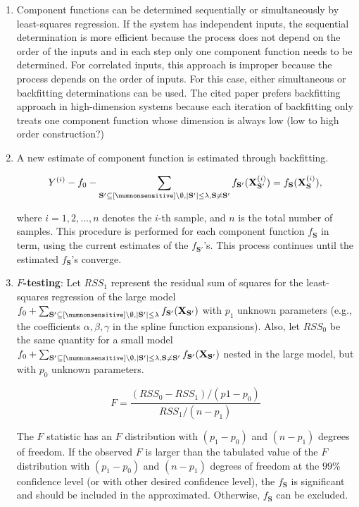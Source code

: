 \begin{enumerate}
\begin{enumerate}
		\item Component functions can be determined sequentially or simultaneously by least-squares regression. If the system has independent inputs, the sequential determination is more efficient because the process does not depend on the order of the inputs and in each step only one component function needs to be determined. For correlated inputs, this approach is improper because the process depends on the order of inputs. For this case, either simultaneous or backfitting determinations can be used. The cited paper prefers backfitting approach in high-dimension systems because each iteration of backfitting only treats one component function whose dimension is always low (low to high order construction?) 
		
		\item A new estimate of component function is estimated through backfitting. 
		
		\[
		Y^{(i)} - f_{0}  - \sum_{\mathbf{S'} \subseteq [\numnonsensitive] \setminus \emptyset, |\mathbf{S'}| \le \lambda, \mathbf{S} \ne \mathbf{S}'} f_{\mathbf{S}'}(\mathbf{X}_{\mathbf{S'}}^{(i)}) = f_{\mathbf{S}}(\mathbf{X}_{\mathbf{S}}^{(i)}),  
		\] 
		
		where $ i = 1, 2, \dots, n $ denotes the $ i $-th sample, and $ n $ is the total number of samples. This procedure is performed for each component function $ f_{\mathbf{S}} $ in term, using the current estimates of the $ f_{\mathbf{S}'} $'s. This process continues until the estimated $ f_{\mathbf{S}} $'s converge.
		
		\item \textbf{$ F $-testing}: Let $ RSS_1 $ represent the residual sum of squares for the least-squares regression of the large model $ f_0 + \sum_{\mathbf{S}' \subseteq [\numnonsensitive] \setminus \emptyset, |\mathbf{S}'| \le \lambda} f_{\mathbf{S}'}(\mathbf{X}_{\mathbf{S}'})  $ with $ p_1 $ unknown parameters (e.g., the coefficients $ \alpha, \beta, \gamma $ in the spline function expansions). Also, let $ RSS_0 $ be the same quantity for a small model $ f_0 + \sum_{\mathbf{S}' \subseteq [\numnonsensitive] \setminus \emptyset, |\mathbf{S}'| \le \lambda, \mathbf{S} \ne \mathbf{S}'} f_{\mathbf{S}'}(\mathbf{X}_{\mathbf{S}'})  $ nested in the large model, but with $ p_0 $ unknown parameters. 
		
		\[
		F = \frac{(RSS_0 - RSS_1)/(p1 - p_0)}{RSS_1 / (n - p_1)}
		\]		
		
		The $ F $ statistic has an $ F $ distribution with $ (p_1 - p_0) $ and $ (n - p_1) $ degrees of freedom. If the observed $ F $ is larger than the tabulated value of the $ F $ distribution with $ (p_1 - p_0) $ and $ (n - p_1) $ degrees of freedom at the $ 99 \% $ confidence level (or with other desired confidence level), the $ f_{\mathbf{S}} $ is significant  and should be included in the approximated. Otherwise, $ f_{\mathbf{S}} $ can be excluded. 
	\end{enumerate}
\end{enumerate}
